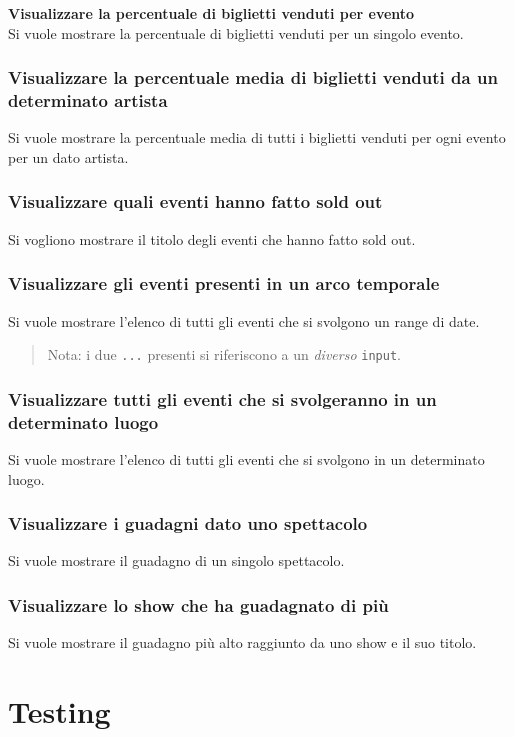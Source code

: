 \documentclass[a4paper,11pt]{article}
\begin{document}
\textbf{Visualizzare la percentuale di biglietti venduti per evento}\\
Si vuole mostrare la percentuale di biglietti venduti per un singolo evento.


\subsubsection{Visualizzare la percentuale media di biglietti venduti da un determinato artista}
Si vuole mostrare la percentuale media di tutti i biglietti venduti per ogni
evento per un dato artista.


\subsubsection{Visualizzare quali eventi hanno fatto sold out}
Si vogliono mostrare il titolo degli eventi che hanno fatto sold out.

 
\subsubsection{Visualizzare gli eventi presenti in un arco temporale}
Si vuole mostrare l'elenco di tutti gli eventi che si svolgono un range di date.


\begin{quote}
  Nota: i due \texttt{...} presenti si riferiscono a un \emph{diverso} \texttt{input}.
\end{quote}

\subsubsection{Visualizzare tutti gli eventi che si svolgeranno in un determinato luogo}
Si vuole mostrare l'elenco di tutti gli eventi che si svolgono in un determinato luogo.


\subsubsection{Visualizzare i guadagni dato uno spettacolo}
Si vuole mostrare il guadagno di un singolo spettacolo.


\subsubsection{Visualizzare lo show che ha guadagnato di più}
Si vuole mostrare il guadagno più alto raggiunto da uno show e il suo titolo.


\section{Testing}
\end{document}
